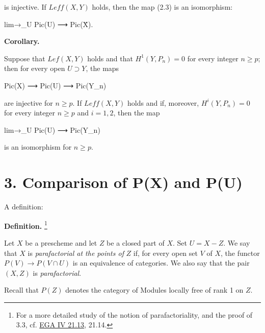 \documentclass[
  11pt,
  a4paper,
]{book}
\newenvironment{Shaded}{}{}
\newcommand{\NormalTok}[1]{#1}
\begin{document}
is injective. If \(Leff(X, Y)\) holds, then the map (2.3) is an
isomorphism:

\begin{Shaded}
\begin{Highlighting}[]
\NormalTok{lim→\_U Pic(U) ⟶ Pic(X̂).}
\end{Highlighting}
\end{Shaded}

\textbf{Corollary.}

Suppose that \(Lef(X, Y)\) holds and that \(H^{1}(Y, P_{n}) = 0\) for
every integer \(n \geqslant p\); then for every open \(U
\supset Y\), the maps

\begin{Shaded}
\begin{Highlighting}[]
\NormalTok{Pic(X) ⟶ Pic(U) ⟶ Pic(Y\_n)}
\end{Highlighting}
\end{Shaded}

are injective for \(n \geqslant p\). If \(Leff(X, Y)\) holds and if,
moreover, \(H^{i}(Y, P_{n}) = 0\) for every integer \(n
\geqslant p\) and \(i = 1, 2\), then the map

\begin{Shaded}
\begin{Highlighting}[]
\NormalTok{lim→\_U Pic(U) ⟶ Pic(Y\_n)}
\end{Highlighting}
\end{Shaded}

is an isomorphism for \(n \geqslant p\).

\section{3. Comparison of P(X) and P(U)}\label{comparison-of-px-and-pu}

A definition:

\textbf{Definition.} \footnote{For a more detailed study of the notion
  of parafactoriality, and the proof of 3.3, cf.
  \href{https://jcreinhold.github.io/ega/iv/34-ch4-21-divisors.html\#2113-parafactorial-couples-parafactorial-local-rings}{EGA
  IV 21.13}, 21.14.}

Let \(X\) be a prescheme and let \(Z\) be a closed part of \(X\). Set
\(U = X - Z\). We say that \(X\) is \emph{parafactorial at the points
of} \(Z\) if, for every open set \(V\) of \(X\), the functor
\(P(V) \to P(V \cap U)\) is an equivalence of categories. We also say
that the pair \((X, Z)\) is \emph{parafactorial}.

Recall that \(P(Z)\) denotes the category of Modules locally free of
rank 1 on \(Z\).
\end{document}
